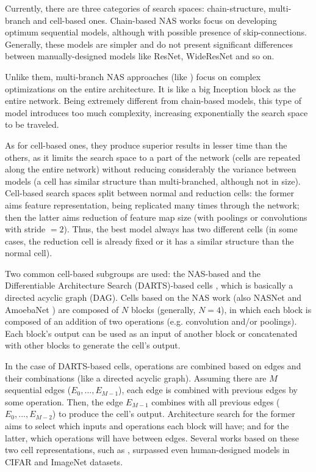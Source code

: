 \documentclass[conference]{IEEEtran}
\begin{document}
	Currently, there are three categories of search spaces: chain-structure, multi-branch  and cell-based ones.
	Chain-based NAS works focus on developing optimum sequential models, although with possible presence of skip-connections.
	Generally, these models are simpler and do not present significant differences between manually-designed models like ResNet, WideResNet and so on.
	
	Unlike them, multi-branch NAS approaches (like \cite{elsken2017simple, elsken1804efficient}) focus on complex optimizations on the entire architecture.
	It is like a big Inception \cite{szegedy2017inception} block as the entire network.
	Being extremely different from chain-based models, this type of model introduces too much complexity, increasing exponentially the search space to be traveled.
	
	As for cell-based ones, they produce superior results in lesser time than the others, as it limits the search space to a part of the network (cells are repeated along the entire network) without reducing considerably the variance between models (a cell has similar structure than multi-branched, although not in size).
	Cell-based search spaces split between normal and reduction cells: the former aims feature representation, being replicated many times through the network; then the latter aims reduction of feature map size (with poolings or convolutions with stride $=2$).
	Thus, the best model always has two different cells (in some cases, the reduction cell is already fixed or it has a similar structure than the normal cell).
	
	Two common cell-based subgroups are used: the NAS-based \cite{elsken2017simple} and the Differentiable Architecture Search (DARTS)-based cells \cite{liu2018darts}, which is basically a directed acyclic graph (DAG).
	Cells based on the NAS work (also NASNet \cite{zoph2017learning} and AmoebaNet \cite{real2018regularized}) are composed of $N$ blocks (generally, $N=4$), in which each block is composed of an addition of two operations (e.g. convolution and/or poolings).
	Each block's output can be used as an input of another block or concatenated with other blocks to generate the cell's output.
	
	In the case of DARTS-based cells, operations are combined based on edges and their combinations (like a directed acyclic graph).
	Assuming there are $M$ sequential edges ($E_0, ..., E_{M-1}$), each edge is combined with previous edges by some operation.
	Then, the edge $E_{M-1}$ combines with all previous edges ($E_0, ..., E_{M-2}$) to produce the cell's output.
	Architecture search for the former aims to select which inputs and operations each block will have; and for the latter, which operations will have between edges.
	Several works based on these two cell representations, such as \cite{elsken2017simple, zoph2017learning, real2018regularized, liu2018darts}, surpassed even human-designed models in CIFAR and ImageNet datasets. 
	
\end{document}

